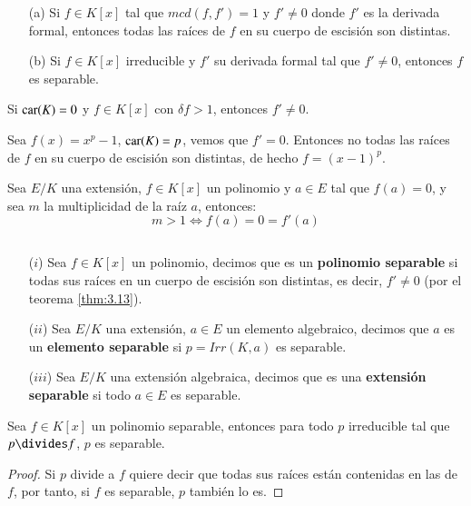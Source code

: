 \begin{thm}\label{thm:3.13}\label{thm:3.4.1}$ $
    \begin{itemize}
        \item[(a)] Si $f \in K[x]$ tal que $mcd(f, f') = 1$ y $f' \neq 0$ donde $f'$ es la derivada formal, entonces todas las raíces de $f$ en su cuerpo de escisión son distintas.
        \item[(b)] Si $f \in K[x]$ irreducible y $f'$ su derivada formal tal que $f' \neq 0$, entonces $f$ es separable.
    \end{itemize}
\end{thm}
\begin{obs}
    Si $\mathrm{car}(K) = 0$ y $f\in K[x]$ con $\delta f > 1$, entonces $f' \neq 0$.
\end{obs}

\begin{eg}
    Sea $f(x) = x^p -1$, $\mathrm{car}(K) = p$, vemos que $f' = 0$. Entonces no todas las raíces de $f$ en su cuerpo de escisión son distintas, de hecho $f = (x-1)^p$.
\end{eg}

\begin{pro}\label{pro:3.4.2}
    Sea $E/K$ una extensión, $f \in K[x]$  un polinomio y $a \in E$ tal que $f(a) = 0$, y sea $m$ la multiplicidad de la raíz $a$, entonces:
    $$
        m > 1 \iff f(a)=0=f'(a)
    $$
\end{pro}

\begin{dfn}$ $
    \begin{itemize}
        \item[($i$)] Sea $f \in K[x]$ un polinomio, decimos que es un \textbf{polinomio separable} si todas sus raíces en un cuerpo de escisión son distintas, es decir, $f' \neq 0$ (por el teorema \ref{thm:3.13}).
        \item[($ii$)] Sea $E/K$ una extensión, $a \in E$ un elemento algebraico, decimos que $a$ es un \textbf{elemento separable} si $p = Irr(K, a)$ es separable.
        \item[($iii$)] Sea $E/K$ una extensión algebraica, decimos que es una \textbf{extensión separable} si todo $a \in E$ es separable.
    \end{itemize}
\end{dfn}

\begin{pro}\label{pro:sepdiv}
    Sea $f \in K[x]$ un polinomio separable, entonces para todo $p$ irreducible tal que $p \divides f$, $p$ es separable.
\end{pro}
\begin{proof}
    Si $p$ divide a $f$ quiere decir que todas sus raíces están contenidas en las de $f$, por tanto, si $f$ es separable, $p$ también lo es.
\end{proof}

